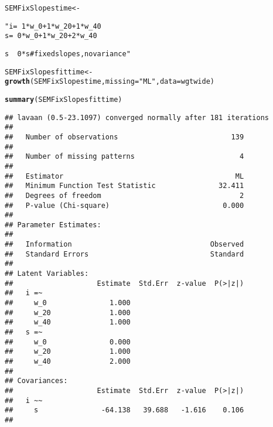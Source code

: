 \documentclass{article}\usepackage[]{graphicx}\usepackage[]{color}
\makeatletter
\newcommand{\hlstr}[1]{\textcolor[rgb]{0.192,0.494,0.8}{#1}}%
\newcommand{\hlstd}[1]{\textcolor[rgb]{0.345,0.345,0.345}{#1}}%
\newcommand{\hlkwb}[1]{\textcolor[rgb]{0.69,0.353,0.396}{#1}}%
\newcommand{\hlkwc}[1]{\textcolor[rgb]{0.333,0.667,0.333}{#1}}%
\newcommand{\hlkwd}[1]{\textcolor[rgb]{0.737,0.353,0.396}{\textbf{#1}}}%
\newenvironment{kframe}{%
 \def\at@end@of@kframe{}%
 \ifinner\ifhmode%
  \def\at@end@of@kframe{\end{minipage}}%
  \begin{minipage}{\columnwidth}%
 \fi\fi%
 \def\FrameCommand##1{\hskip\@totalleftmargin \hskip-\fboxsep
 \colorbox{shadecolor}{##1}\hskip-\fboxsep
     \hskip-\linewidth \hskip-\@totalleftmargin \hskip\columnwidth}%
 \MakeFramed {\advance\hsize-\width
   \@totalleftmargin\z@ \linewidth\hsize
   \@setminipage}}%
 {\par\unskip\endMakeFramed%
 \at@end@of@kframe}
\newenvironment{knitrout}{}{} %
\makeatother
\begin{document}
\begin{knitrout}
\color{fgcolor}\begin{kframe}
\begin{alltt}
\hlstd{SEMFixSlopestime} \hlkwb{<-} \hlstr{" i =~ 1*w_0 + 1*w_20 + 1*w_40
                  s =~ 0*w_0 + 1*w_20 + 2*w_40

                  s ~~ 0*s #fixed slopes, no variance"}
\hlstd{SEMFixSlopesfittime} \hlkwb{<-} \hlkwd{growth}\hlstd{(SEMFixSlopestime,} \hlkwc{missing} \hlstd{=} \hlstr{"ML"}\hlstd{,} \hlkwc{data} \hlstd{= wgtwide)}
\end{alltt}


{\ttfamily\noindent{}}\begin{alltt}
\hlkwd{summary}\hlstd{(SEMFixSlopesfittime)}
\end{alltt}
\begin{verbatim}
## lavaan (0.5-23.1097) converged normally after 181 iterations
## 
##   Number of observations                           139
## 
##   Number of missing patterns                         4
## 
##   Estimator                                         ML
##   Minimum Function Test Statistic               32.411
##   Degrees of freedom                                 2
##   P-value (Chi-square)                           0.000
## 
## Parameter Estimates:
## 
##   Information                                 Observed
##   Standard Errors                             Standard
## 
## Latent Variables:
##                    Estimate  Std.Err  z-value  P(>|z|)
##   i =~                                                
##     w_0               1.000                           
##     w_20              1.000                           
##     w_40              1.000                           
##   s =~                                                
##     w_0               0.000                           
##     w_20              1.000                           
##     w_40              2.000                           
## 
## Covariances:
##                    Estimate  Std.Err  z-value  P(>|z|)
##   i ~~                                                
##     s               -64.138   39.688   -1.616    0.106
## 

\end{verbatim}
\end{kframe}
\end{knitrout}
\end{document}
